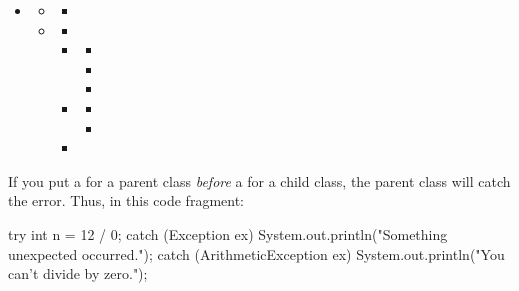 \begin{itemize}
    \item {}
        \begin {itemize}
            \item {}
                \begin{itemize}
                    \item {}
                \end{itemize}
            \item {}
            \begin {itemize}
                \item {}
                \item {}
                    \begin{itemize}
                        \item {}
                        \item {}
                        \item {}
                    \end{itemize}
                \item {}
                    \begin{itemize}
                        \item {}
                        \item {}
                    \end{itemize}
                \item {}
              \end{itemize}
    \end{itemize}
\end{itemize}

If you put a  for a parent class {\em before} a  for a child class, the parent class will catch the error.
Thus, in this code fragment:

\begin{code}
try {
    int n = 12 / 0;
}
catch (Exception ex) {
    System.out.println("Something unexpected occurred.");
}
catch (ArithmeticException ex) {
    System.out.println("You can't divide by zero.");
}
\end{code}

